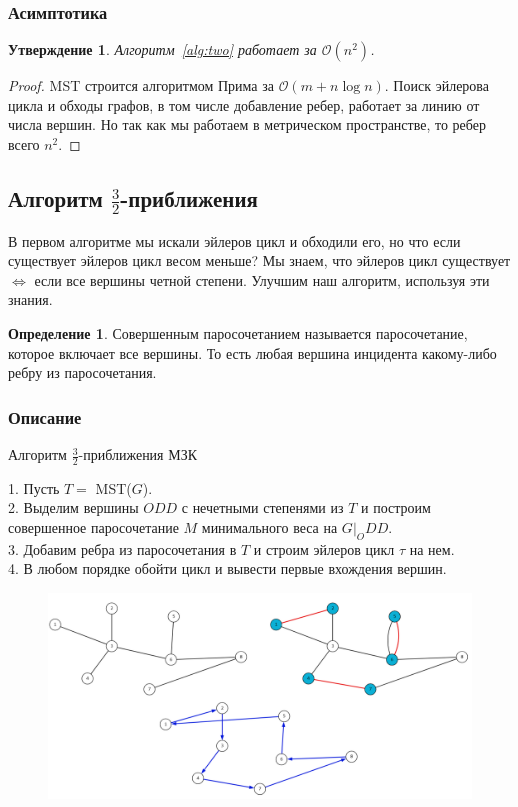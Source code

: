 \documentclass[a4paper,12pt]{article}
\theoremstyle{plain}
\newtheorem{proposition}{Утверждение}[section]
\theoremstyle{definition}
\newtheorem{definition}{Определение}[section]
\theoremstyle{remark}
\begin{document}
\subsubsection{Асимптотика}
\begin{proposition}
    Алгоритм~\ref{alg:two} работает за $\mathcal{O}(n^2)$.
\end{proposition}

\begin{proof}
    \textsf{MST} строится алгоритмом Прима за $\mathcal{O}(m + n\log{n})$. Поиск эйлерова цикла и обходы графов, в том числе добавление ребер, работает за линию от числа вершин. Но так как мы работаем в метрическом пространстве, то ребер всего $n^2$.
\end{proof}

\subsection{Алгоритм $\frac{3}{2}$-приближения}
В первом алгоритме мы искали эйлеров цикл и обходили его, но что если существует эйлеров цикл весом меньше? Мы знаем, что эйлеров цикл существует $\Leftrightarrow$ если все вершины четной степени. Улучшим наш алгоритм, используя эти знания.

\begin{definition}
    Совершенным паросочетанием называется паросочетание, которое включает все вершины.
    То есть любая вершина инцидента какому-либо ребру из паросочетания.
\end{definition}

\subsubsection{Описание}
\begin{algorithm}
\caption{Алгоритм  $\frac{3}{2}$-приближения МЗК}\label{alg:twothree}
1. Пусть $T =$ \textsf{MST}($G$). \\
2. Выделим вершины $ODD$ с нечетными степенями из $T$ и построим совершенное паросочетание $M$ минимального веса на $G\vert_ODD$. \\
3. Добавим ребра из паросочетания в $T$ и строим эйлеров цикл $\tau$ на нем. \\
4. В любом порядке обойти цикл и вывести первые вхождения вершин.
\end{algorithm}

\begin{figure}[!h]
    \includegraphics[width=17cm]{img/pic2_algo.png}
    \centering
\end{figure}
\end{document}

